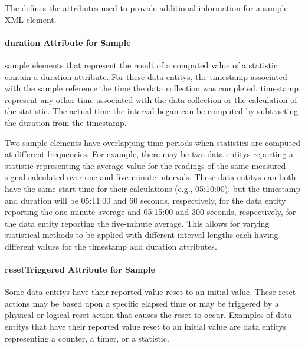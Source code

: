 The  defines the attributes used to provide additional information for a \gls{sample} XML element.   



\newpage

\paragraph{duration Attribute for Sample}\mbox{}

\gls{sample} elements that represent the result of a computed value of a statistic \must contain a \gls{duration} attribute.  For these \glspl{data entity}, the \gls{timestamp} associated with the \gls{sample} \must reference the time the data collection was completed.  \gls{timestamp} \MUSTNOT represent any other time associated with the data collection or the calculation of the statistic.  The actual time the interval began can be computed by subtracting the \gls{duration} from the \gls{timestamp}.

Two \gls{sample} elements \may have overlapping time periods when statistics are computed at different frequencies.  For example, there may be two \glspl{data entity} reporting a statistic representing the average value for the readings of the same measured signal calculated over one and five minute intervals.  These \glspl{data entity} can both have the same start time for their calculations (e.g., 05:10:00), but the \gls{timestamp} and \gls{duration} will be 05:11:00 and 60 seconds, respectively, for the \gls{data entity} reporting the one-minute average and 05:15:00 and 300 seconds, respectively, for the \gls{data entity} reporting the five-minute average.  This allows for varying statistical methods to be applied with different interval lengths each having different values for the \gls{timestamp} and \gls{duration} attributes.  

\paragraph{resetTriggered Attribute for Sample}\mbox{}

Some \glspl{data entity} \may have their reported value reset to an initial value.  These reset actions may be based upon a specific elapsed time or may be triggered by a physical or logical reset action that causes the reset to occur.   Examples of \glspl{data entity} that \may have their reported value reset to an initial value are \glspl{data entity} representing a counter, a timer, or a statistic.

